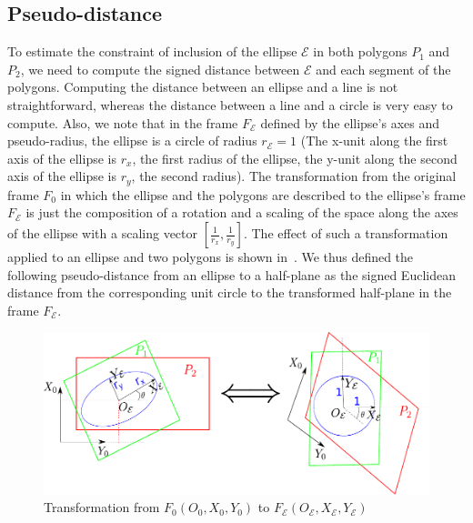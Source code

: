 \subsection{Pseudo-distance}
\label{subsec:formulation}
To estimate the constraint of inclusion of the ellipse $\mathcal{E}$ in both polygons $P_1$ and $P_2$, we need to compute the signed distance between $\mathcal{E}$ and each segment of the polygons. Computing the distance between an ellipse and a line is not straightforward, whereas the distance between a line and a circle is very easy to compute. Also, we note that in the frame $F_\mathcal{E}$ defined by the ellipse's axes and pseudo-radius, the ellipse is a circle of radius $r_{\mathcal{E}}=1$ (The x-unit along the first axis of the ellipse is $r_x$, the first radius of the ellipse, the y-unit along the second axis of the ellipse is $r_y$, the second radius). The transformation from the original frame $F_0$ in which the ellipse and the polygons are described to the ellipse's frame $F_\mathcal{E}$ is just the composition of a rotation and a scaling of the space along the axes of the ellipse with a scaling vector $[\frac{1}{r_x}, \frac{1}{r_y}]$. The effect of such a transformation applied to an ellipse and two polygons is shown in~. %
We thus defined the following pseudo-distance from an ellipse to a half-plane as the signed Euclidean distance from the corresponding unit circle to the transformed half-plane in the frame $F_\mathcal{E}$.

\begin{figure}[!htb]
 \centering
 \includegraphics[width=\linewidth]{papers/IROS2014/figure/pseudo-distance.pdf}
 \caption{Transformation from $F_0(O_0, X_0, Y_0)$ to $F_\mathcal{E}(O_\mathcal{E},X_\mathcal{E},Y_\mathcal{E})$}
 \label{fig:pseudo-distance}
\end{figure}

